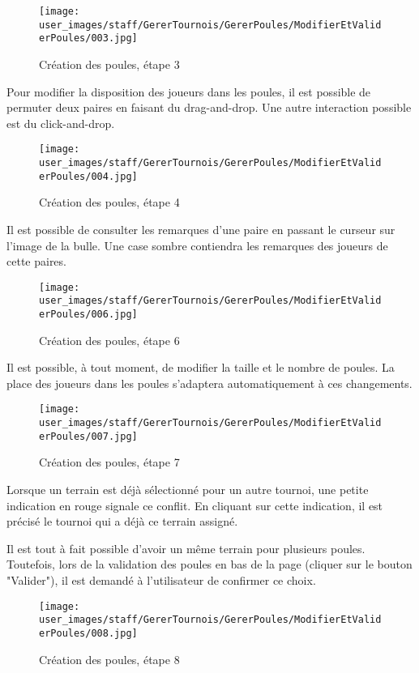 \begin{figure}[H]
\centering
\texttt{[image: user\_images/staff/GererTournois/GererPoules/ModifierEtValiderPoules/003.jpg]}
\caption{Création des poules, étape 3}
\end{figure}

Pour modifier la disposition des joueurs dans les poules, il est possible de permuter deux paires en faisant du drag-and-drop. Une autre interaction possible est du click-and-drop.

\begin{figure}[H]
\centering
\texttt{[image: user\_images/staff/GererTournois/GererPoules/ModifierEtValiderPoules/004.jpg]}
\caption{Création des poules, étape 4}
\end{figure}

Il est possible de consulter les remarques d'une paire en passant le curseur sur l'image de la bulle. Une case sombre contiendra les remarques des joueurs de cette paires.

\begin{figure}[H]
\centering
\texttt{[image: user\_images/staff/GererTournois/GererPoules/ModifierEtValiderPoules/006.jpg]}
\caption{Création des poules, étape 6}
\end{figure}

Il est possible, à tout moment, de modifier la taille et le nombre de poules. La place des joueurs dans les poules s'adaptera automatiquement à ces changements.

\begin{figure}[H]
\centering
\texttt{[image: user\_images/staff/GererTournois/GererPoules/ModifierEtValiderPoules/007.jpg]}
\caption{Création des poules, étape 7}
\end{figure}

Lorsque un terrain est déjà sélectionné pour un autre tournoi, une petite indication en rouge signale ce conflit. En cliquant sur cette indication, il est précisé le tournoi qui a déjà ce terrain assigné.\newline

Il est tout à fait possible d'avoir un même terrain pour plusieurs poules. Toutefois, lors de la validation des poules en bas de la page (cliquer sur le bouton "Valider"), il est demandé à l'utilisateur de confirmer ce choix.

\begin{figure}[H]
\centering
\texttt{[image: user\_images/staff/GererTournois/GererPoules/ModifierEtValiderPoules/008.jpg]}
\caption{Création des poules, étape 8}
\end{figure}

